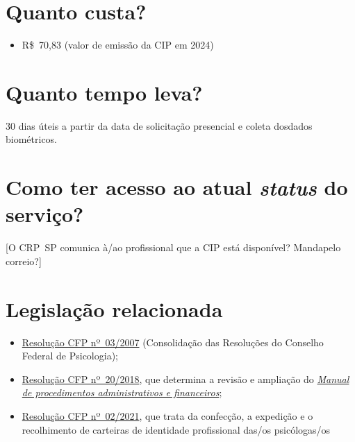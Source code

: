 \section{Quanto custa?}

\begin{itemize}
  \item  R\$~70,83 (valor de emissão da CIP em 2024)
\end{itemize}

\section{Quanto tempo leva?}

30 dias úteis a partir da data de solicitação presencial e coleta dosdados biométricos.

\section{Como ter acesso ao atual \emph{status} do serviço?}

{[}O CRP~SP comunica à/ao profissional que a CIP está disponível? Mandapelo correio?{]}

\section{Legislação relacionada}

\begin{itemize}
  \item  \href{https://atosoficiais.com.br/cfp/resolucao-administrativa-financeira-n-3-2007-institui-a-consolidacao-das-resolucoes-do-conselho-federal-de-psicologia?origin=instituicao&q=resolu\%C3\%A7\%C3\%A3o\%203/2007}{Resolução  CFP nº~03/2007} (Consolidação das Resoluções do Conselho Federal de  Psicologia);
  \item  \href{https://transparencia.cfp.org.br/wp-content/uploads/sites/7/2020/05/Manual-de-Procedimentos-Administrativos-e-Financeiro-CFP-RES-20.2018.pdf}{\href{https://atosoficiais.com.br/cfp/resolucao-administrativa-financeira-n-20-2018-altera-o-manual-de-procedimentos-administrativo-e-financeiro-do-sistema-conselhos-de-psicologia-anexo-da-resolucao-cfp-n-202018-a-resolucao-cfp-n-03-2007-a-resolucao-cfp-n-16-2019-e-da-outras-providencias}{Resolução  CFP nº~20/2018}}, que determina a revisão e ampliação do  \href{https://transparencia.cfp.org.br/wp-content/uploads/sites/7/2020/05/Manual-de-Procedimentos-Administrativos-e-Financeiro-CFP-RES-20.2018.pdf}{\emph{Manual  de procedimentos administrativos e financeiros}};
  \item  \href{https://atosoficiais.com.br/cfp/resolucao-administrativa-financeira-n-2-2021-dispoe-sobre-a-confeccao-a-expedicao-e-o-recolhimento-de-carteiras-de-identidade-profissional-das-os-psicologas-os-revoga-o-capitulo-vi-da-resolucao-cfp-no-03-2007-os-1o-2o-4o-5o-do-art-2o-da-resolucao-cfp-no-02-2007-1o-4o-5o-do-art-2o-e-1o-do-art-4o-da-resolucao-cfp-no-01-1984-e-da-outras-providencias}{Resolução  CFP nº~02/2021}, que trata da confecção, a expedição e o recolhimento  de carteiras de identidade profissional das/os psicólogas/os
\end{itemize}


